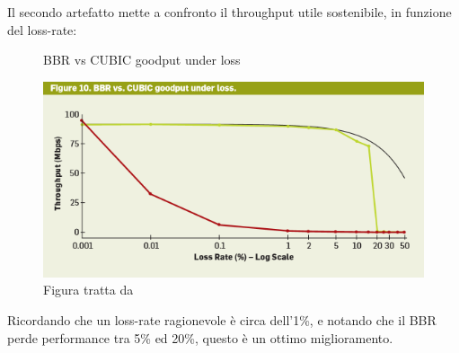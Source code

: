 Il secondo artefatto mette a confronto il throughput utile sostenibile, in funzione del loss-rate:

\begin{figure}[H]

\center
\caption{BBR vs CUBIC goodput under loss}
\includegraphics[scale=1]{chapters/application/img/bbr_vs_cubic_loss_rate}
\caption*{Figura tratta da \cite[p.~65]{Cardwell:2017:BCC:3042068.3009824}}

\end{figure}

Ricordando che un loss-rate ragionevole è circa dell'1\%, e notando che il BBR perde performance tra 5\% ed 20\%, questo è un ottimo miglioramento.


